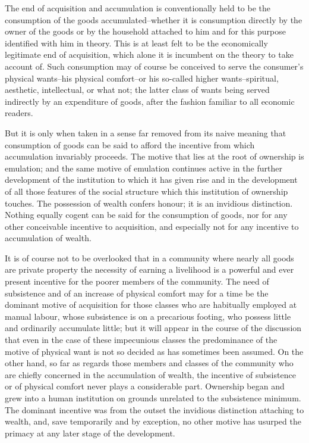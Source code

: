 \documentclass[12pt]{report}
\begin{document}
The end of acquisition and accumulation is conventionally held to be the
consumption of the goods accumulated--whether it is consumption directly
by the owner of the goods or by the household attached to him and for
this purpose identified with him in theory. This is at least felt to
be the economically legitimate end of acquisition, which alone it is
incumbent on the theory to take account of. Such consumption may of
course be conceived to serve the consumer's physical wants--his
physical comfort--or his so-called higher wants--spiritual, aesthetic,
intellectual, or what not; the latter class of wants being served
indirectly by an expenditure of goods, after the fashion familiar to all
economic readers.

But it is only when taken in a sense far removed from its naive meaning
that consumption of goods can be said to afford the incentive from which
accumulation invariably proceeds. The motive that lies at the root
of ownership is emulation; and the same motive of emulation continues
active in the further development of the institution to which it has
given rise and in the development of all those features of the social
structure which this institution of ownership touches. The possession of
wealth confers honour; it is an invidious distinction. Nothing equally
cogent can be said for the consumption of goods, nor for any other
conceivable incentive to acquisition, and especially not for any
incentive to accumulation of wealth.

It is of course not to be overlooked that in a community where nearly
all goods are private property the necessity of earning a livelihood
is a powerful and ever present incentive for the poorer members of
the community. The need of subsistence and of an increase of physical
comfort may for a time be the dominant motive of acquisition for those
classes who are habitually employed at manual labour, whose subsistence
is on a precarious footing, who possess little and ordinarily accumulate
little; but it will appear in the course of the discussion that even in
the case of these impecunious classes the predominance of the motive of
physical want is not so decided as has sometimes been assumed. On the
other hand, so far as regards those members and classes of the community
who are chiefly concerned in the accumulation of wealth, the incentive
of subsistence or of physical comfort never plays a considerable part.
Ownership began and grew into a human institution on grounds unrelated
to the subsistence minimum. The dominant incentive was from the outset
the invidious distinction attaching to wealth, and, save temporarily and
by exception, no other motive has usurped the primacy at any later stage
of the development.
\end{document}
